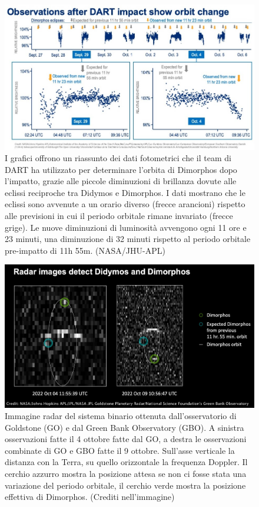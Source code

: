 \documentclass[a4paper,11pt,openright]{book}
\begin{document}
\begin{figure}
    \centering
    \includegraphics[width=\textwidth]{figure/impact_lightcurve.jpg}
    \caption[Riassunto dei dati fotometrici utilizzati per determinare l'orbita post-impatto.]{I grafici offrono un riassunto dei dati fotometrici che il team di DART ha utilizzato per determinare l'orbita di Dimorphos dopo l'impatto, grazie alle piccole diminuzioni di brillanza dovute alle eclissi reciproche tra Didymos e Dimorphos. I dati mostrano che le eclissi sono avvenute a un orario diverso (frecce arancioni) rispetto alle previsioni in cui il periodo orbitale rimane invariato (frecce grige). Le nuove diminuzioni di luminosità avvengono ogni 11 ore e 23 minuti, una diminuzione di 32 minuti rispetto al periodo orbitale pre-impatto di 11h 55m. (NASA/JHU-APL)}
    \label{fig:impact_lightcurve}
\end{figure}

\begin{figure}
    \centering
    \includegraphics[scale=0.25]{figure/expected_dimorphos.png}
    \caption[Riassunto dei dati fotometrici utilizzati per determinare l'orbita post-impatto.]{Immagine radar del sistema binario ottenuta dall'osservatorio di Goldstone (GO) e dal Green Bank Observatory (GBO). A sinistra osservazioni fatte il 4 ottobre fatte dal GO, a destra le osservazioni combinate di GO e GBO fatte il 9 ottobre. Sull'asse verticale la distanza con la Terra, su quello orizzontale la frequenza Doppler. Il cerchio azzurro mostra la posizione attesa se non ci fosse stata una variazione del periodo orbitale, il cerchio verde mostra la posizione effettiva di Dimorphos. (Crediti nell'immagine)}
    \label{fig:expected_dimorphos}
\end{figure}
\end{document}
